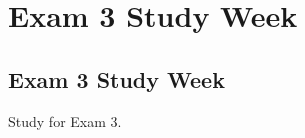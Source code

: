 \clearpage

\renewcommand{\ChapTitle}{Exam 3 Study Week}
\renewcommand{\SectionTitle}{Exam 3 Study Week}

\chapter{\ChapTitle}
\section{\SectionTitle}

Study for Exam 3.